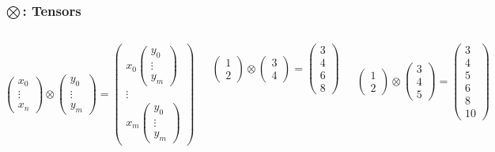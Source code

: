 \documentclass{beamer}
\begin{document}
\begin{frame}
\frametitle{$\bigotimes$: Tensors}

\begin{columns}[c] %


\begin{definition}
    $\begin{pmatrix}x_0 \\ \vdots \\ x_n\end{pmatrix} \otimes \begin{pmatrix}y_0 \\ \vdots \\ y_m\end{pmatrix} = \begin{pmatrix} x_0 \begin{pmatrix} y_0 \\ \vdots \\ y_m \end{pmatrix} \\ \vdots \\ x_m \begin{pmatrix} y_0 \\ \vdots \\ y_m \end{pmatrix}\end{pmatrix}$
\end{definition}


\[
    \begin{pmatrix} 1 \\ 2 \end{pmatrix}
    \otimes
    \begin{pmatrix} 3 \\ 4 \end{pmatrix} = 
    \begin{pmatrix} 3 \\ 4 \\ 6 \\ 8 \end{pmatrix}
\]

\[
    \begin{pmatrix} 1 \\ 2 \end{pmatrix}
    \otimes
    \begin{pmatrix} 3 \\ 4 \\ 5 \end{pmatrix} = 
    \begin{pmatrix} 3 \\ 4 \\ 5 \\6 \\ 8 \\  10 \end{pmatrix}
\]


\end{columns}
\end{frame}
\end{document}
